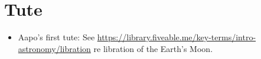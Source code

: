 %
%

\chapter{Tute}

\begin{itemize}
\item Aapo's first tute: See \url{https://library.fiveable.me/key-terms/intro-astronomy/libration} re libration of the Earth's Moon.
\end{itemize}

\newpage
\thispagestyle{empty}
